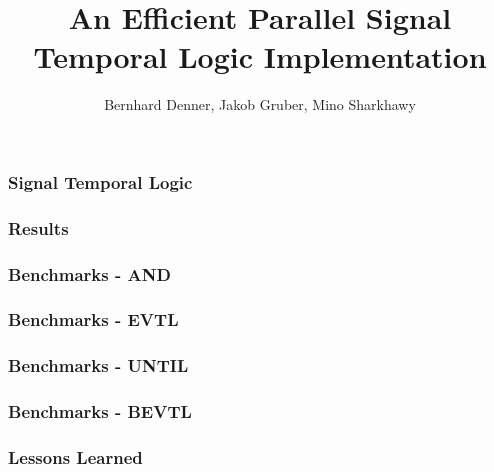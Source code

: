 \documentclass[notes=show]{beamer}
\title{An Efficient Parallel Signal Temporal Logic Implementation}
\author{
	Bernhard Denner,
	Jakob Gruber,
	Mino Sharkhawy
}
\begin{document}
\maketitle

\begin{frame}
\frametitle{Signal Temporal Logic}
\end{frame}

\begin{frame}
\frametitle{Results}
\end{frame}

\begin{frame}
\frametitle{Benchmarks - AND}
\end{frame}

\begin{frame}
\frametitle{Benchmarks - EVTL}
\end{frame}

\begin{frame}
\frametitle{Benchmarks - UNTIL}
\end{frame}

\begin{frame}
\frametitle{Benchmarks - BEVTL}
\end{frame}

\begin{frame}
\frametitle{Lessons Learned}
\end{frame}
\end{document}
